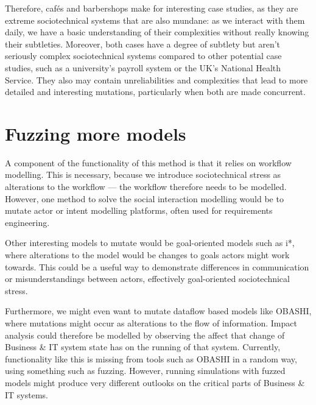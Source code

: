Therefore, cafés and barbershops make for interesting case studies, as they are extreme sociotechnical systems that are also mundane: as we interact with them daily, we have a basic understanding of their complexities without really knowing their subtleties. Moreover, both cases have a degree of subtlety but aren't seriously complex sociotechnical systems compared to other potential case studies, such as a university's payroll system or the UK's National Health Service. They also may contain unreliabilities and complexities that lead to more detailed and interesting mutations, particularly when both are made concurrent. \par



\section{Fuzzing more models}
\label{fuzzing_more_models}
A component of the functionality of this method is that it relies on workflow modelling. This is necessary, because we introduce sociotechnical stress as alterations to the workflow --- the workflow therefore needs to be modelled. However, one method to solve the social interaction modelling would be to mutate actor or intent modelling platforms, often used for requirements engineering. \par

Other interesting models to mutate would be goal-oriented models such as i*\cite{Yu2009}, where alterations to the model would be changes to goals actors might work towards. This could be a useful way to demonstrate differences in communication or misunderstandings between actors, effectively goal-oriented sociotechnical stress. \par

Furthermore, we might even want to mutate dataflow based models like OBASHI\cite{ObashiMethodology}, where mutations might occur as alterations to the flow of information. Impact analysis\cite{Bohner96softwarechange} could therefore be modelled by observing the affect that change of Business \& IT system state has on the running of that system. Currently, functionality like this is missing from tools such as OBASHI in a random way, using something such as fuzzing. However, running simulations with fuzzed models might produce very different outlooks on the critical parts of Business \& IT systems.  \par

